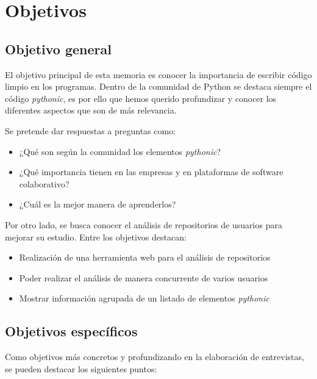 \documentclass[a4paper, 12pt]{book}
\begin{document}
\cleardoublepage %
\chapter{Objetivos} %
\label{chap:objetivos} %

\section{Objetivo general} %
\label{sec:objetivo-general} %

El objetivo principal de esta memoria es conocer la importancia de escribir código limpio en los programas. Dentro de la comunidad de Python se destaca siempre el código \textit{pythonic}, es por ello que hemos querido profundizar y conocer los diferentes aspectos que son de más relevancia.

Se pretende dar respuestas a preguntas como:

\begin{itemize}
    \item ¿Qué son según la comunidad los elementos \textit{pythonic}?
    \item ¿Qué importancia tienen en las empresas y en plataformas de software colaborativo?
    \item ¿Cuál es la mejor manera de aprenderlos?
\end{itemize}

Por otro lado, se busca conocer el análisis de repositorios de usuarios para mejorar su estudio. Entre los objetivos destacan:
\begin{itemize}
    \item Realización de una herramienta web para el análisis de repositorios
    \item Poder realizar el análisis de manera concurrente de varios usuarios
    \item Mostrar información agrupada de un listado de elementos \textit{pythonic}
\end{itemize}


\section{Objetivos específicos}
\label{sec:objetivos-especificos}

Como objetivos más concretos y profundizando en la elaboración de entrevistas, se pueden destacar los siguientes puntos:
\end{document}
